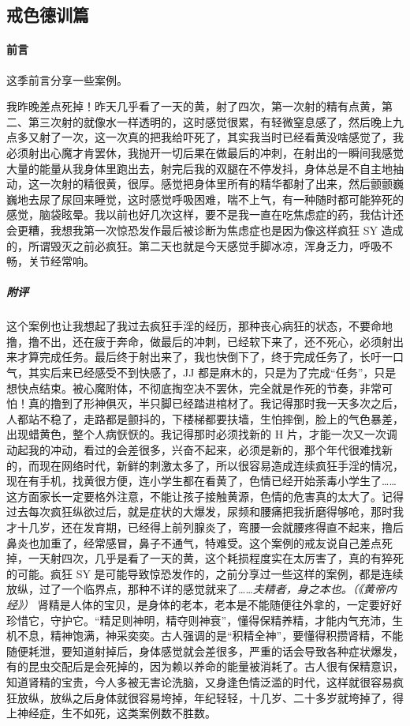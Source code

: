 \subsection{戒色德训篇}

\paragraph{前言}

这季前言分享一些案例。

\begin{case}
    我昨晚差点死掉！昨天几乎看了一天的黄，射了四次，第一次射的精有点黄，第二、第三次射的就像水一样透明的，这时感觉很累，有轻微窒息感了，然后晚上九点多又射了一次，这一次真的把我给吓死了，其实我当时已经看黄没啥感觉了，我必须射出心魔才肯罢休，我抛开一切后果在做最后的冲刺，在射出的一瞬间我感觉大量的能量从我身体里跑出去，射完后我的双腿在不停发抖，身体总是不自主地抽动，这一次射的精很黄，很厚。感觉把身体里所有的精华都射了出来，然后颤颤巍巍地去尿了尿回来睡觉，这时感觉呼吸困难，喘不上气，有一种随时都可能猝死的感觉，脑袋眩晕。我以前也好几次这样，要不是我一直在吃焦虑症的药，我估计还会更糟，我想我第一次惊恐发作最后被诊断为焦虑症也是因为像这样疯狂 SY 造成的，所谓毁灭之前必疯狂。第二天也就是今天感觉手脚冰凉，浑身乏力，呼吸不畅，关节经常响。
    \subparagraph{附评} 这个案例也让我想起了我过去疯狂手淫的经历，那种丧心病狂的状态，不要命地撸，撸不出，还在疲于奔命，做最后的冲刺，已经软下来了，还不死心，必须射出来才算完成任务。最后终于射出来了，我也快倒下了，终于完成任务了，长吁一口气，其实后来已经感受不到快感了，JJ 都是麻木的，只是为了完成“任务”，只是想快点结束。被心魔附体，不彻底掏空决不罢休，完全就是作死的节奏，非常可怕！真的撸到了形神俱灭，半只脚已经踏进棺材了。我记得那时我一天多次之后，人都站不稳了，走路都是颤抖的，下楼梯都要扶墙，生怕摔倒，脸上的气色暴差，出现蜡黄色，整个人病恹恹的。我记得那时必须找新的 H 片，才能一次又一次调动起我的冲动，看过的会差很多，兴奋不起来，必须是新的，那个年代很难找新的，而现在网络时代，新鲜的刺激太多了，所以很容易造成连续疯狂手淫的情况，现在有手机，找黄很方便，连小学生都在看黄了，色情已经开始荼毒小学生了……这方面家长一定要格外注意，不能让孩子接触黄源，色情的危害真的太大了。记得过去每次疯狂纵欲过后，就是症状的大爆发，尿频和腰痛把我折磨得够呛，那时我才十几岁，还在发育期，已经得上前列腺炎了，弯腰一会就腰疼得直不起来，撸后鼻炎也加重了，经常感冒，鼻子不通气，特难受。这个案例的戒友说自己差点死掉，一天射四次，几乎是看了一天的黄，这个耗损程度实在太厉害了，真的有猝死的可能。疯狂 SY 是可能导致惊恐发作的，之前分享过一些这样的案例，都是连续放纵，过了一个临界点，那种不详的感觉就来了……\textit{夫精者，身之本也。（《黄帝内经》）} 肾精是人体的宝贝，是身体的老本，老本是不能随便往外拿的，一定要好好珍惜它，守护它。“精足则神明，精夺则神衰”，懂得保精养精，才能内气充沛，生机不息，精神饱满，神采奕奕。古人强调的是“积精全神”，要懂得积攒肾精，不能随便耗泄，要知道射掉后，身体感觉就会差很多，严重的话会导致各种症状爆发，有的昆虫交配后是会死掉的，因为赖以养命的能量被消耗了。古人很有保精意识，知道肾精的宝贵，今人多被无害论洗脑，又身逢色情泛滥的时代，这样就很容易疯狂放纵，放纵之后身体就很容易垮掉，年纪轻轻，十几岁、二十多岁就垮掉了，得上神经症，生不如死，这类案例数不胜数。


\end{case}
